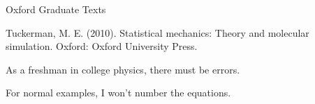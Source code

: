 
Oxford Graduate Texts

Tuckerman, M. E. (2010). Statistical mechanics: Theory and molecular simulation. Oxford: Oxford University Press.

As a freshman in college physics, there must be errors.

For normal examples, I won't number the equations.